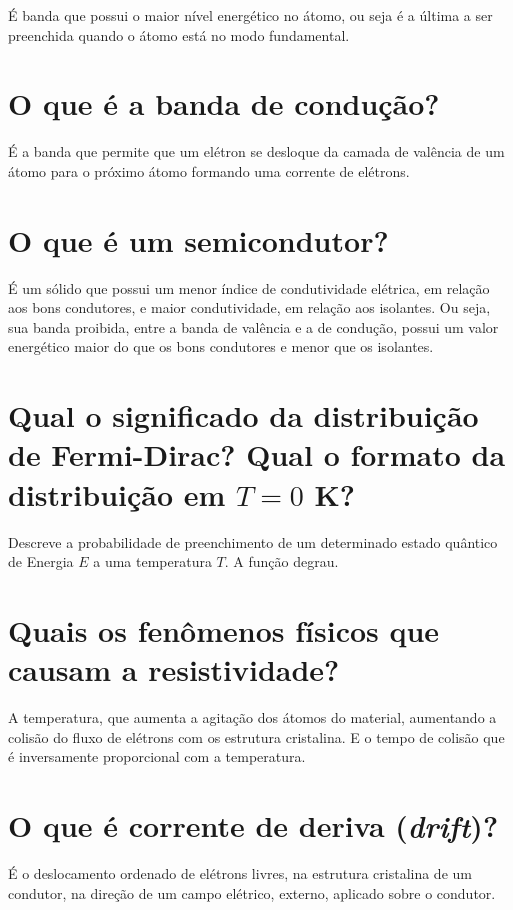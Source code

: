 É banda que possui o maior nível energético no átomo, ou seja é a
última a ser preenchida quando o átomo está no modo fundamental.

\section*{O que é a banda de condução?}
\label{q6}

É a banda que permite que um elétron se desloque da camada de valência de um
átomo para o próximo átomo formando uma corrente de elétrons.

\section*{O que é um semicondutor?}
\label{q7}

É um sólido  que possui um menor índice de  condutividade elétrica, em
relação aos  bons condutores,  e maior  condutividade, em  relação aos
isolantes. Ou seja, sua banda proibida,  entre a banda de valência e a
de  condução,  possui  um  valor  energético  maior  do  que  os  bons
condutores e menor que os isolantes.

\section*{Qual o significado da distribuição de Fermi-Dirac? Qual o
  formato da distribuição em $T = 0$ K?}
\label{q8}

Descreve a probabilidade de preenchimento de um determinado estado
quântico de Energia $E$ a uma temperatura $T$. A função degrau.

\section*{Quais os fenômenos físicos que causam a resistividade?}
\label{q9}

A temperatura, que aumenta a agitação dos átomos do material, aumentando a colisão
do fluxo de elétrons com os estrutura cristalina. E o tempo de colisão
que é inversamente proporcional com a temperatura.

\section*{O que é corrente de deriva (\emph{drift})?}
\label{q10}

É o deslocamento ordenado de elétrons livres, na estrutura cristalina
de um condutor, na direção de um campo elétrico, externo, aplicado
sobre o condutor.

